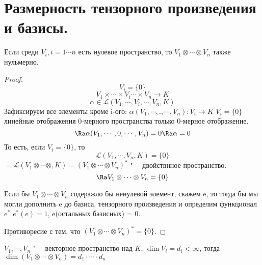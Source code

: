 ﻿\section{Размерность тензорного произведения и базисы.}

\begin{lemma}
Если среди $V_i,  i = 1 \cdots n$ есть нулевое пространство, 
то $V_1 \otimes \cdots \otimes V_n$  также нульмерно. 
\end{lemma}
\begin{proof}
    $$V_i = \{0\}$$
    $$V_1 \times \cdots \times V_i \cdots \times V_n \to K$$
    $$\alpha \in \mathcal{L}(V_1, \cdots, V_i, \cdots, V_n, K)$$
    Зафиксируем все элементы кроме i-ого: $\alpha(V_1, \cdots, ., \cdots, V_n) \colon V_i \to K$
    $V_i = \{0\}$ линейные отображения 0-мерного пространства только 0-мерное отображение. 
    $$\Ra \alpha(V_1, \cdots, 0, \cdots, V_n) = 0 \Ra \alpha = 0$$
    То есть, если $V_i = \{0\}$, то 
    $$\mathcal{L}(V_1, \cdots, V_n, K) = \{0\}$$
    $= \mathcal{L}(V_1 \otimes \cdots \otimes, K) = (V_1 \otimes \cdots \otimes V_n)^*$ "--- двойствнное пространство. 
    $$\Ra V_1 \otimes \cdots \otimes V_n = \{0\}$$

    Если бы $V_1 \otimes \cdots \otimes V_n$ содеражло бы ненулевой элемент, скажем e, 
    то тогда бы мы могли дополнить e до базиса, тензорного произведения  и определим функционал $e^*$
    $e^*(e) = 1$, e(остальных базисных) = 0.

    Противоресие с тем, что $(V_1 \otimes \cdots \otimes V_n)^* = \{0\}$.
\end{proof}
\begin{theorem}
    $V_1, \cdots, V_n$ "--- векторное пространство над $K$, $\dim V_i = d_i < \infty$, 
    тогда $\dim(V_1 \otimes \cdots \otimes V_n) = d_1 \cdot \cdots \cdot d_n$
\end{theorem}
